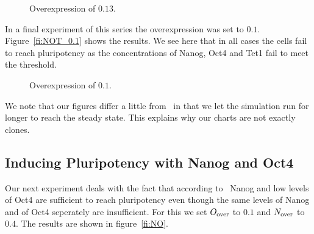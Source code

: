 \begin{figure}
\centering
\begin{minipage}[t]{0.3\textwidth}
\centering
\graphicspath{{../Plots/}}

\end{minipage}
\hfill
\begin{minipage}[t]{0.3\textwidth}
\centering
\graphicspath{{../Plots/}}

\end{minipage}
\hspace*{0.2cm}
\begin{minipage}[t]{0.3\textwidth}
\centering
\graphicspath{{../Plots/}}

\end{minipage}
\caption{Overexpression of $0.13$.}
\label{pl:NOT_0.13}
\end{figure}

In a final experiment of this series the overexpression was set to $0.1$. Figure~\ref{fi:NOT_0.1} shows 
the results. We see here that in all cases the cells fail to reach pluripotency as the 
concentrations of Nanog, Oct4 and Tet1 fail to meet the threshold.

\begin{figure}
\centering
\begin{minipage}[t]{0.3\textwidth}
\centering
\graphicspath{{../Plots/}}

\end{minipage}
\hfill
\begin{minipage}[t]{0.3\textwidth}
\centering
\graphicspath{{../Plots/}}

\end{minipage}
\hspace*{0.2cm}
\begin{minipage}[t]{0.3\textwidth}
\centering
\graphicspath{{../Plots/}}

\end{minipage}
\caption{Overexpression of $0.1$.}
\label{pl:NOT_0.1}
\end{figure}

We note that our figures differ a little from~\cite{Olariu2016} in that we let the simulation run
for longer to reach the steady state. This explains why our charts are not exactly clones.

\subsection{Inducing Pluripotency with Nanog and Oct4}

Our next experiment deals with the fact that according to~\cite{Olariu2016} Nanog and low levels
of Oct4 are sufficient to reach pluripotency even though the same levels of Nanog and of Oct4 seperately
are insufficient. For this we set $O_\text{over}$ to $0.1$ and $N_\text{over}$ to $0.4$. The results are shown in
figure~\ref{fi:NO}.

